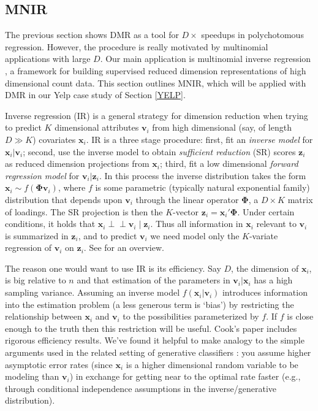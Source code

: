 \documentclass[12pt]{article}
\newcommand{\bs}[1]{\boldsymbol{#1}}
\newcommand{\bm}[1]{\mathbf{#1}}
\newcommand{\indep}{\perp\!\!\!\perp}
\begin{document}
\subsection{MNIR}
\label{MNIR}

The previous section shows DMR as a tool for $D\times$ speedups in
polychotomous regression.  However, the procedure is really motivated by
multinomial applications with large $D$.  Our main application is multinomial
inverse regression \citep[MNIR][]{taddy_multinomial_2013}, a framework for
building supervised reduced dimension representations of high dimensional
count data.  This section outlines MNIR, which will be applied with DMR in our
Yelp case study of Section \ref{YELP}.

Inverse regression (IR) is a general strategy for dimension reduction when
trying to predict $K$ dimensional attributes $\bm{v}_i$ from high dimensional
(say, of length $D \gg K$) covariates $\bm{x}_i$.  IR is a three stage
procedure: first, fit an {\it inverse model} for $\bm{x}_i | \bm{v}_i$;
second, use the inverse model to obtain {\it sufficient reduction} (SR) scores
$\bm{z}_i$ as reduced dimension projections from $\bm{x}_i$; third, fit a low
dimensional {\it forward regression model} for $\bm{v}_i | \bm{z}_i$.   In
this process the inverse distribution takes the form $\bm{x}_i \sim
f(\bs{\Phi}\bm{v}_i)$, where $f$ is some parametric (typically natural
exponential family) distribution that depends upon $\bm{v}_i$ through the
linear operator $\bs{\Phi}$, a $D\times K$ matrix of loadings.  The SR
projection is then the $K$-vector $\bm{z}_i = \bm{x}_i'\bs{\Phi}$. Under
certain conditions, it  holds that $\bm{x}_i \indep \bm{v}_i \mid \bm{z}_i$.
Thus all information in $\bm{x}_i$ relevant to $\bm{v}_i$ is summarized in
$\bm{z}_i$, and to predict $\bm{v}_i$ we need model only the $K$-variate
regression of $\bm{v}_i$ on $\bm{z}_i$. See \citet{cook_fisher_2007} for an
overview.

The reason one would want to use IR is its efficiency.  Say $D$, the dimension
of $\bm{x}_i$, is big relative to $n$ and that estimation of the parameters in
$\bm{v}_i |\bm{x}_i$ has a high sampling variance.  Assuming an inverse model
$f(\bm{x}_i | \bm{v}_i)$ introduces information into the estimation problem (a
less generous term is `bias') by restricting the relationship between
$\bm{x}_i$ and $\bm{v}_i$ to the possibilities parameterized by $f$.  If $f$
is close enough to the truth then this restriction will be useful.  Cook's
paper includes rigorous efficiency results.  We've found it helpful to make
analogy to the simple arguments used in the related setting of generative
classifiers \citep[e.g., as in][for Gaussian
discrimination]{efron_efficiency_1975}: you  assume higher asymptotic error
rates (since $\bm{x}_i$ is a higher dimensional random variable to be modeling
than $\bm{v}_i$) in exchange for getting near to the optimal rate faster
(e.g., through conditional independence assumptions in the inverse/generative
distribution).
\end{document}
